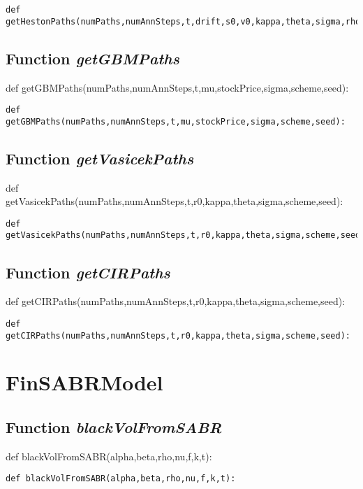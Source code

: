 \documentclass[twoside,11pt]{book}
\begin{document}
\begin{lstlisting}
def getHestonPaths(numPaths,numAnnSteps,t,drift,s0,v0,kappa,theta,sigma,rho,scheme,seed):
\end{lstlisting}

\subsection{Function {\it getGBMPaths}}
def getGBMPaths(numPaths,numAnnSteps,t,mu,stockPrice,sigma,scheme,seed):

\begin{lstlisting}
def getGBMPaths(numPaths,numAnnSteps,t,mu,stockPrice,sigma,scheme,seed):
\end{lstlisting}

\subsection{Function {\it getVasicekPaths}}
def getVasicekPaths(numPaths,numAnnSteps,t,r0,kappa,theta,sigma,scheme,seed):

\begin{lstlisting}
def getVasicekPaths(numPaths,numAnnSteps,t,r0,kappa,theta,sigma,scheme,seed):
\end{lstlisting}

\subsection{Function {\it getCIRPaths}}
def getCIRPaths(numPaths,numAnnSteps,t,r0,kappa,theta,sigma,scheme,seed):

\begin{lstlisting}
def getCIRPaths(numPaths,numAnnSteps,t,r0,kappa,theta,sigma,scheme,seed):
\end{lstlisting}

\newpage
\section{FinSABRModel}

\subsection{Function {\it blackVolFromSABR}}
def blackVolFromSABR(alpha,beta,rho,nu,f,k,t): 

\begin{lstlisting}
def blackVolFromSABR(alpha,beta,rho,nu,f,k,t): 
\end{lstlisting}
\end{document}
